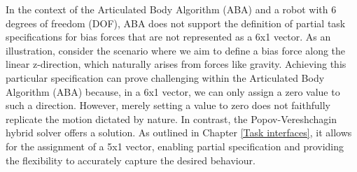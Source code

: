\documentclass[report.tex]{subfiles}
\begin{document}
    In the context of the Articulated Body Algorithm (ABA) and a robot with 6 degrees of freedom (DOF), ABA does not support the definition of partial task specifications for bias forces that are not represented as a 6x1 vector. As an illustration, consider the scenario where we aim to define a bias force along the linear z-direction, which naturally arises from forces like gravity. Achieving this particular specification can prove challenging within the Articulated Body Algorithm (ABA) because, in a 6x1 vector, we can only assign a zero value to such a direction. However, merely setting a value to zero does not faithfully replicate the motion dictated by nature.
    In contrast, the Popov-Vereshchagin hybrid solver offers a solution. As outlined in Chapter \ref{Task interfaces}, it allows for the assignment of a 5x1 vector, enabling partial specification and providing the flexibility to accurately capture the desired behaviour.
    \raggedbottom
\end{document}
